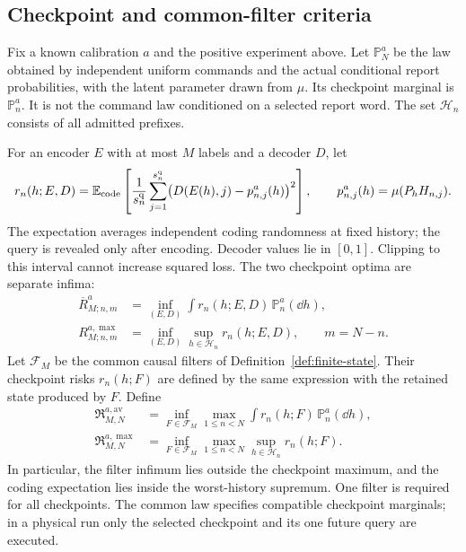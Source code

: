 \subsection{Checkpoint and common-filter criteria}
\begin{definition}\label{def:monomial-risks-v24}
Fix a known calibration $a$ and the positive experiment above.
Let $\mathbb P_N^a$ be the law obtained by independent uniform commands
and the actual conditional report probabilities, with the latent
parameter drawn from $\mu$. Its checkpoint marginal is
$\mathbb P_n^a$. It is not the command law conditioned on a selected
report word. The set $\mathcal H_n$ consists of all admitted prefixes.

For an encoder $E$ with at most $M$ labels and a decoder $D$, let
\[
 r_n(h;E,D)=\mathbb E_{\rm code}\left[
  \frac1{s_n^{\rm q}}\sum_{j=1}^{s_n^{\rm q}}
       \bigl(D(E(h),j)-p_{n,j}^a(h)\bigr)^2\right],
 \qquad p_{n,j}^a(h)=\mu(P_hH_{n,j}).
\]
The expectation averages independent coding randomness at fixed
history; the query is revealed only after encoding. Decoder values
lie in $[0,1]$. Clipping to this interval cannot increase squared loss.
The two checkpoint optima are separate infima:
\begin{equation}\label{eq:monomial-checkpoint-risks-v24}
 \begin{split}
 \overline R_{M;n,m}^{a}
   &=\inf_{(E,D)}\int r_n(h;E,D)\,\mathbb P_n^a(\dd h),\\
 R_{M;n,m}^{a,\max}
   &=\inf_{(E,D)}\sup_{h\in\mathcal H_n}r_n(h;E,D),
 \qquad m=N-n.
 \end{split}
\end{equation}
Let $\mathcal F_M$ be the common causal filters of
Definition~\ref{def:finite-state}. Their checkpoint risks $r_n(h;F)$
are defined by the same expression with the retained state produced
by $F$. Define
\begin{equation}\label{eq:monomial-causal-risks-v24}
 \begin{split}
 \mathfrak R_{M,N}^{a,\mathrm{av}}
   &=\inf_{F\in\mathcal F_M}\max_{1\le n<N}
       \int r_n(h;F)\,\mathbb P_n^a(\dd h),\\
 \mathfrak R_{M,N}^{a,\max}
   &=\inf_{F\in\mathcal F_M}\max_{1\le n<N}
       \sup_{h\in\mathcal H_n}r_n(h;F).
 \end{split}
\end{equation}
In particular, the filter infimum lies outside the checkpoint maximum,
and the coding expectation lies inside the worst-history supremum.
One filter is required for all checkpoints. The common law specifies
compatible checkpoint marginals; in a physical run only the selected
checkpoint and its one future query are executed.
\end{definition}
